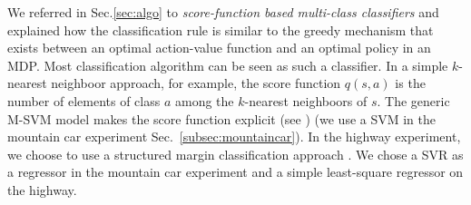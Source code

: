 \documentclass[smallextended]{svjour3}
\begin{document}
We referred in Sec.\ref{sec:algo} to \emph{score-function based multi-class classifiers} and explained how the classification rule is similar to the greedy mechanism that exists between an optimal action-value function and an optimal policy in an MDP. Most classification algorithm can be seen as such a classifier. In a simple $k$-nearest neighboor approach, for example, the score function $q(s,a)$ is the number of elements of class $a$ among the $k$-nearest neighboors of $s$. The generic M-SVM model makes the score function explicit (see \cite{guermeur2011generic}) (we use a SVM in the mountain car experiment Sec.~\ref{subsec:mountaincar}). In the highway experiment, we choose to use a structured margin classification approach \cite{taskar2005learning}.
We chose a SVR as a regressor in the mountain car experiment and a simple least-square regressor on the highway.
\end{document}
